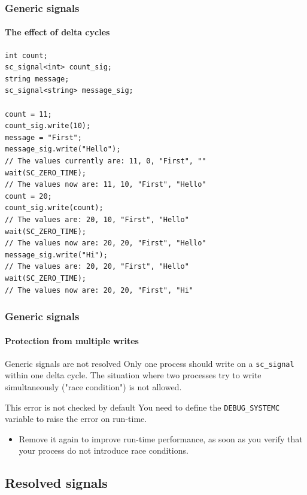 \begin{frame}[fragile]
\frametitle{Generic signals}
\framesubtitle{The effect of delta cycles}

{\scriptsize 
\begin{verbatim}
int count;
sc_signal<int> count_sig;
string message;
sc_signal<string> message_sig;

count = 11;
count_sig.write(10);
message = "First";
message_sig.write("Hello");
// The values currently are: 11, 0, "First", ""
wait(SC_ZERO_TIME);
// The values now are: 11, 10, "First", "Hello"
count = 20;
count_sig.write(count);
// The values are: 20, 10, "First", "Hello"
wait(SC_ZERO_TIME);
// The values now are: 20, 20, "First", "Hello"
message_sig.write("Hi");
// The values are: 20, 20, "First", "Hello"
wait(SC_ZERO_TIME);
// The values now are: 20, 20, "First", "Hi"
\end{verbatim}
}
\end{frame}

\begin{frame}
\frametitle{Generic signals}
\framesubtitle{Protection from multiple writes}

\begin{block}{Generic signals are not resolved}
Only one process should write on a \texttt{sc\_signal} within one delta cycle. 
The situation where two processes try to write simultaneously ("race condition") is not allowed.
\end{block}
\pause
\begin{block}{This error is not checked by default}
You need to define the \texttt{DEBUG\_SYSTEMC} variable to raise the error on run-time.
\begin{itemize}
\item Remove it again to improve run-time performance, as soon as you verify that your process do not introduce race conditions.
\end{itemize}
\end{block}
\end{frame}

\subsection{Resolved signals}

